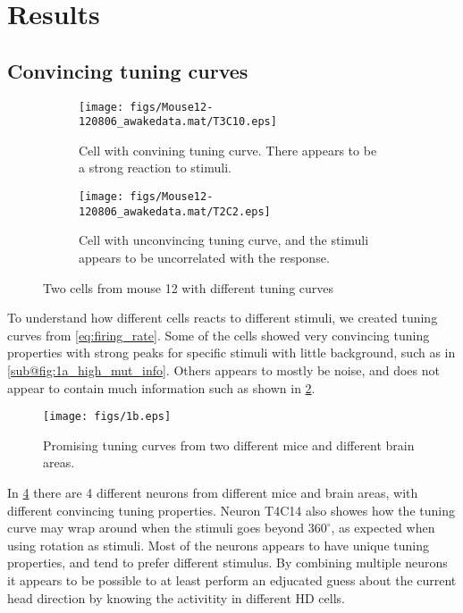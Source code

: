 \section{Results}

\subsection{Convincing tuning curves}
\begin{figure}
    \centering
    \begin{subfigure}[b]{0.4\textwidth}
        \texttt{[image: figs/Mouse12-120806\_awakedata.mat/T3C10.eps]}
        \caption{Cell with convining tuning curve. There appears to be a strong reaction to stimuli.}
        \label{fig:1a_high_mut_info}
    \end{subfigure}
    \begin{subfigure}[b]{0.4\textwidth}
        \texttt{[image: figs/Mouse12-120806\_awakedata.mat/T2C2.eps]}
        \caption{Cell with unconvincing tuning curve, and the stimuli appears to be uncorrelated with the response.}
        \label{fig:1a_low_mut_info}
    \end{subfigure}
    \caption{Two cells from mouse 12 with different tuning curves}
    \label{fig:1a_two_tuning_curves}
\end{figure}
To understand how different cells reacts to different stimuli, we created tuning curves from \cref{eq:firing_rate}. Some of the cells showed very convincing tuning properties with strong peaks for specific stimuli with little background, such as in \cref{sub@fig:1a_high_mut_info}. Others appears to mostly be noise, and does not appear to contain much information such as shown in \cref{fig:1a_low_mut_info}. 
\begin{figure}[H]
    \centering
    \texttt{[image: figs/1b.eps]}
    \caption{Promising tuning curves from two different mice and different brain areas. }
    \label{fig:1b_convincing_tuning}
\end{figure} 
In \cref{fig:1b_convincing_tuning} there are 4 different neurons from different mice and brain areas, with different convincing tuning properties. Neuron T4C14 also showes how the tuning curve may wrap around when the stimuli goes beyond $360^\circ$, as expected when using rotation as stimuli. Most of the neurons appears to have unique tuning properties, and tend to prefer different stimulus. By combining multiple neurons it appears to be possible to at least perform an edjucated guess about the current head direction by knowing the activitity in different HD cells.
